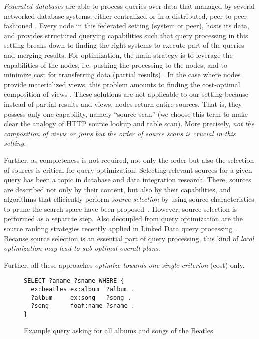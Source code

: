 \emph{Federated databases} are able to process queries over data that
managed by several networked database systems, either centralized
\cite{} or in a distributed, peer-to-peer fashioned \cite{}. Every
node in this federated setting (system or peer), hosts its data, and
provides structured querying capabilities such that query processing
in this setting breaks down to finding the right systems to execute
part of the queries and merging results. For optimization, the main
strategy is to leverage the capabilities of the nodes, i.e. pushing
the processing to the nodes, and to minimize cost for transferring
data (partial results) \cite{}. In the case where nodes provide
materialized views, this problem amounts to finding the cost-optimal
composition of views \cite{pottinger_minicon:_2001}. These solutions
are not applicable to our setting because instead of partial results
and views, nodes return entire sources. That is, they possess only one
capability, namely ``source scan'' (we choose this term to make clear
the analogy of HTTP source lookup and table scan). More precisely,
\emph{not the composition of views or joins but the order of source
  scans is crucial in this setting.} 

Further, as completeness is not required, not only the order but also
the selection of sources is critical for query optimization. Selecting
relevant sources for a given query has been a topic in database and
data integration research. There, sources are described not only by
their content, but also by their capabilities, and algorithms that
efficiently perform \emph{source selection} by using source
characteristics to prune the search space have been
proposed~\cite{levy_querying_1996}. However, source selection is
performed as a separate step. Also decoupled from query optimization
are the source ranking strategies recently applied in Linked Data
query processing~\cite{harth_data_2010,ladwig_linked_2010}. Because
source selection is an essential part of query processing, this kind
of \emph{local optimization may lead to sub-optimal overall plans}.


Further, all these approaches \emph{optimize towards one single
  criterion} (cost) only.

\begin{figure}[htb]
  \centering
\begin{lstlisting}[language=ttl]
SELECT ?aname ?sname WHERE {
  ex:beatles ex:album  ?album .
  ?album     ex:song   ?song .
  ?song      foaf:name ?sname .
}
\end{lstlisting}
  \caption{Example query asking for all albums and songs of the Beatles.}
\end{figure}


